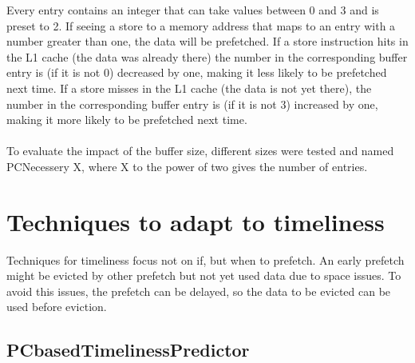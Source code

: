Every entry contains an integer that can take values between 0 and 3 and is preset to 2. If seeing a store to a memory address that maps to an entry with a number greater than one, the data will be prefetched. If a store instruction hits in the L1
cache (the data was already there) the number in the corresponding buffer entry is (if it is not 0) decreased by one, making it less likely to be prefetched next time. If a store misses in the L1 cache (the data is not yet there), the number in the corresponding buffer entry is (if it is not 3) increased by one, making it more likely to be prefetched next time. \\ \\


To evaluate the impact of the buffer size, different sizes were tested and named PCNecessery X, where X to the power of two gives the number of entries.



\section{Techniques to adapt to timeliness} 
Techniques for timeliness focus not on if, but when to prefetch. An early prefetch might be evicted by other prefetch but not yet used data due to space issues. To
avoid this issues, the prefetch can be delayed, so the data to be evicted can be used
before eviction.
\subsection{PCbasedTimelinessPredictor}

